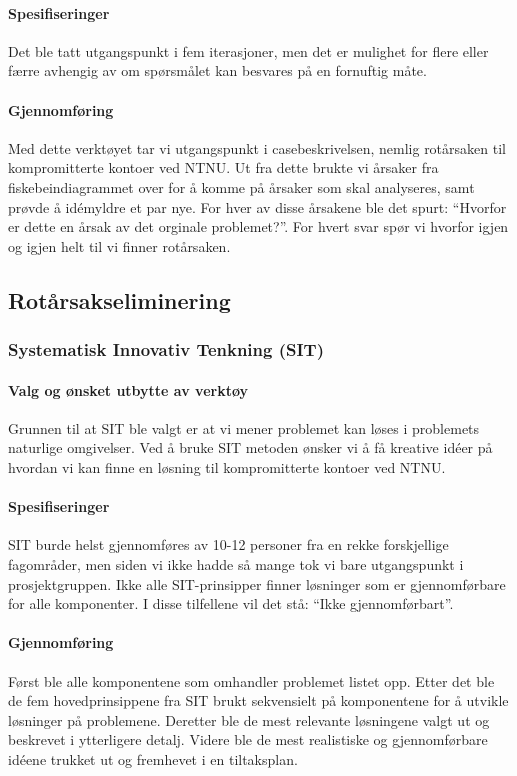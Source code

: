 \paragraph{Spesifiseringer}
Det ble tatt utgangspunkt i fem iterasjoner, men det er mulighet for flere eller færre avhengig av om spørsmålet kan besvares på en fornuftig måte. 

\paragraph{Gjennomføring}
Med dette verktøyet tar vi utgangspunkt i casebeskrivelsen, nemlig rotårsaken til kompromitterte kontoer ved NTNU. Ut fra dette brukte vi årsaker fra fiskebeindiagrammet over for å komme på årsaker som skal analyseres, samt prøvde å idémyldre et par nye. For hver av disse årsakene ble det spurt: ``Hvorfor er dette en årsak av det orginale problemet?''. For hvert svar spør vi hvorfor igjen og igjen helt til vi finner rotårsaken. 

\subsection{Rotårsakseliminering}

\subsubsection{Systematisk Innovativ Tenkning (SIT)}

\paragraph{Valg og ønsket utbytte av verktøy}
Grunnen til at SIT ble valgt er at vi mener problemet kan løses i problemets naturlige omgivelser. Ved å bruke SIT metoden ønsker vi å få kreative idéer på hvordan vi kan finne en løsning til kompromitterte kontoer ved NTNU. 

\paragraph{Spesifiseringer}
SIT burde helst gjennomføres av 10-12 personer fra en rekke forskjellige fagområder, men siden vi ikke hadde så mange tok vi bare utgangspunkt i prosjektgruppen. Ikke alle SIT-prinsipper finner løsninger som er gjennomførbare for alle komponenter. I disse tilfellene vil det stå: ``Ikke gjennomførbart''. 

\paragraph{Gjennomføring}
Først ble alle komponentene som omhandler problemet listet opp. Etter det ble de fem hovedprinsippene fra SIT brukt sekvensielt på komponentene for å utvikle løsninger på problemene. Deretter ble de mest relevante løsningene valgt ut og beskrevet i ytterligere detalj. Videre ble de mest realistiske og gjennomførbare idéene trukket ut og fremhevet i en tiltaksplan.


